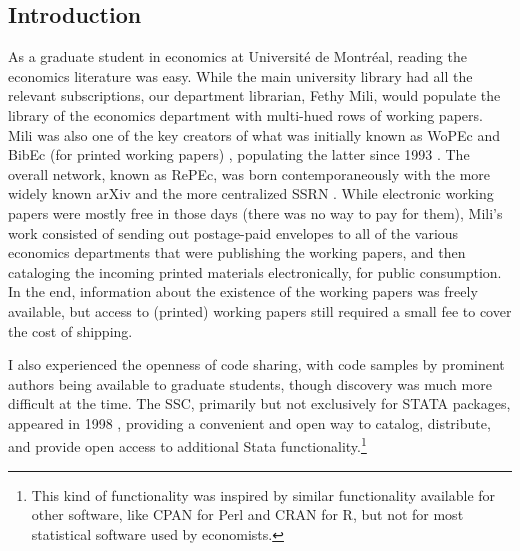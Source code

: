 \documentclass{Revue-economique}
\newcommand{\citep}{\parencite}
\begin{document}
\begin{Article} [%
	Titre={Reproducibility and Open Science in Economics},
	Auteur={Lars Vilhuber\thanks{Cornell University, lars.vilhuber@cornell.edu}}]
	
	\begin{resume}
		
	\end{resume}




\begin{refsection}[Main] %


\newpage
\section{Introduction}


As a graduate student in economics at Université de Montréal, reading the economics literature was  easy. While the main university library had all the relevant subscriptions, our department librarian, Fethy Mili, would populate the library of the economics department with multi-hued rows of working papers. Mili was also one of the key creators of what was initially known as \ac{WoPEc} and BibEc (for printed working papers) \citep{krichel_wopec_1997,cruz_cataloging_2000,krichel_economics_2009}, populating the latter since 1993 \citep[][p. 450]{batizlazo_brief_2012}. The overall network, known as \ac{RePEc}, was born contemporaneously with the more widely known arXiv \citep{ginsparg_it_2011} and the more centralized \ac{SSRN} \citep{noauthor_social_2025}. While electronic working papers were mostly free in those days (there was no way to pay for them), Mili's work consisted of sending out postage-paid envelopes to all of the various economics departments that were publishing the working papers, and then cataloging the incoming printed materials electronically, for public consumption. In the end, information about the existence of the working papers was freely available, but access to (printed) working papers still required a small fee to cover the cost of shipping.

I also experienced the openness of code sharing, with code samples by prominent authors being available to graduate students, though discovery was much more difficult at the time.  The \ac{SSC}, primarily but not exclusively for STATA packages, appeared in 1998 \citep{cox_conversation_2010,cox_stata_2022}, providing a convenient and open way to catalog, distribute, and provide open access to additional Stata functionality.\footnote{This kind of functionality was inspired by similar functionality  available for other software, like CPAN for Perl and CRAN for R, but not for most statistical software used by economists.}


\end{refsection}
\end{Article}
\end{document}
